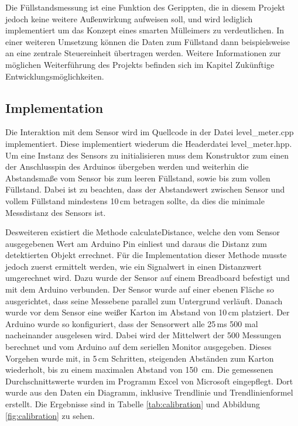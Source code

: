         Die Füllstandsmessung ist eine Funktion des Gerippten, die in diesem Projekt jedoch keine weitere Außenwirkung aufweisen soll, und wird lediglich implementiert um das Konzept eines smarten Mülleimers zu verdeutlichen. In einer weiteren Umsetzung können die Daten zum Füllstand dann beispielsweise an eine zentrale Steuereinheit übertragen werden. Weitere Informationen zur möglichen Weiterführung des Projekts befinden sich im Kapitel Zukünftige Entwicklungsmöglichkeiten.\\

    \subsection{Implementation} 
        Die Interaktion mit dem Sensor wird im Quellcode in der Datei level\_meter.cpp implementiert. Diese implementiert wiederum die Headerdatei level\_meter.hpp. Um eine Instanz des Sensors zu initialisieren muss dem Konstruktor zum einen der Anschlusspin des Arduinos übergeben werden und weiterhin die Abstandsmaße vom Sensor bis zum leeren Füllstand, sowie bis zum vollen Füllstand. Dabei ist zu beachten, dass der Abstandswert zwischen Sensor und vollem Füllstand mindestens 10\,cm betragen sollte, da dies die minimale Messdistanz des Sensors ist.

        Desweiteren existiert die Methode calculateDistance, welche den vom Sensor ausgegebenen Wert am Arduino Pin einliest und daraus die Distanz zum detektierten Objekt errechnet. Für die Implementation dieser Methode musste jedoch zuerst ermittelt werden, wie ein Signalwert in einen Distanzwert umgerechnet wird. Dazu wurde der Sensor auf einem Breadboard befestigt und mit dem Arduino verbunden. Der Sensor wurde auf einer ebenen Fläche so ausgerichtet, dass seine Messebene parallel zum Untergrund verläuft. Danach wurde vor dem Sensor eine weißer Karton im Abstand von 10\,cm platziert. Der Arduino wurde so konfiguriert, dass der Sensorwert alle 25\,ms 500 mal nacheinander ausgelesen wird. Dabei wird der Mittelwert der 500 Messungen berechnet und vom Arduino auf dem seriellen Monitor ausgegeben. Dieses Vorgehen wurde mit, in 5\,cm Schritten, steigenden Abständen zum Karton wiederholt, bis zu einem maximalen Abstand von 150\, cm. Die gemessenen Durchschnittswerte wurden im Programm Excel von Microsoft eingepflegt. Dort wurde aus den Daten ein Diagramm, inklusive Trendlinie und Trendlinienformel erstellt. Die Ergebnisse sind in Tabelle \ref{tab:calibration} und Abbildung \ref{fig:calibration} zu sehen.

